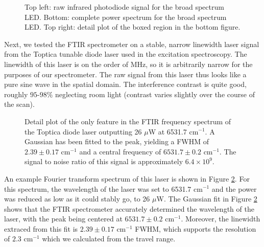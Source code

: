 \documentclass[12pt]{report}
\newcommand{\wn}[1][ ]{cm$^{-1}$#1}
\begin{document}
\begin{figure}[t]
  \centering
  \iftoggle{imgs}{
    \texttt{[image: LEDsignal]}
    \texttt{[image: LEDspectrumzoom]}
    \texttt{[image: LEDspectrum]}
  }{}
  \caption{Top left: raw infrared photodiode signal for the broad spectrum LED. Bottom: complete power spectrum for the broad spectrum LED. Top right: detail plot of the boxed region in the bottom figure.}
  \label{fig:LED}
\end{figure}

Next, we tested the FTIR spectrometer on a stable, narrow linewidth laser signal from the Toptica tunable diode laser used in the excitation spectroscopy. The linewidth of this laser is on the order of MHz, so it is arbitrarily narrow for the purposes of our spectrometer. The raw signal from this laser thus looks like a pure sine wave in the spatial domain. The interference contrast is quite good, roughly $95$-$98\%$ neglecting room light (contrast varies slightly over the course of the scan).

\begin{figure}[t]
  \centering
  \iftoggle{imgs}{
    \texttt{[image: TOPspectrum]}
  }{}
  \caption{Detail plot of the only feature in the FTIR frequency spectrum of the Toptica diode laser outputting 26 $\mu$W at 6531.7 \wn[]. A Gaussian has been fitted to the peak, yielding a FWHM of $2.39 \pm 0.17$ \wn and a central frequency of $6531.7 \pm 0.2$ \wn[.] The signal to noise ratio of this signal is approximately $6.4\times 10^{9}$.}
  \label{fig:toptica}
\end{figure}

An example Fourier transform spectrum of this laser is shown in Figure \ref{fig:toptica}. For this spectrum, the wavelength of the laser was set to 6531.7 \wn and the power was reduced as low as it could stably go, to 26 $\mu$W. The Gaussian fit in Figure \ref{fig:toptica} shows that the FTIR spectrometer accurately determined the wavelength of the laser, with the peak being centered at $6531.7\pm 0.2$ \wn[.] Moreover, the linewidth extraced from this fit is $2.39\pm 0.17$ \wn FWHM, which supports the resolution of $2.3 $ \wn which we calculated from the travel range. 
\end{document}
